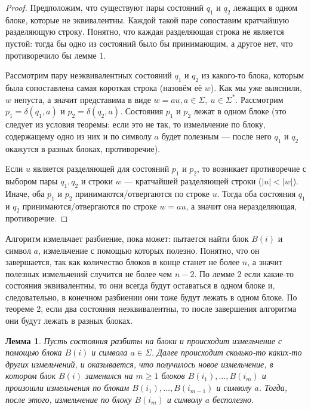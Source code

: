 \documentclass{article}
\newtheorem{lemma}{Лемма}
\begin{document}
\begin{proof}
Предположим, что существуют пары состояний $q_1$ и $q_2$ лежащих в одном блоке, которые не эквивалентны. Каждой такой паре сопоставим кратчайшую разделяющую строку. Понятно, что каждая разделяющая строка не является пустой: тогда бы одно из состояний было бы принимающим, а другое нет, что противоречило бы лемме 1.

Рассмотрим пару неэквивалентных состояний $q_1$ и $q_2$ из какого-то блока, которым была сопоставлена самая короткая строка (назовём её $w$). Как мы уже выяснили, $w$ непуста, а значит представима в виде $w = au, a \in \Sigma, \ u \in \Sigma^*$. Рассмотрим $p_1 = \delta(q_1, a)$ и $p_2 = \delta(q_2, a)$. Состояния $p_1$ и $p_2$ лежат в одном блоке (это следует из условия теоремы: если это не так, то измельчение по блоку, содержащему одно из них и по символу $a$ будет полезным --- после него $q_1$ и $q_2$ окажутся в разных блоках, противоречие).

Если $u$ является разделяющей для состояний $p_1$ и $p_2$, то возникает противоречие с выбором пары $q_1, q_2$ и строки $w$ --- кратчайшей разделяющей строки ($|u| < |w|$). Иначе, оба $p_1$ и $p_2$ принимаются/отвергаются по строке $u$. Тогда оба состояния $q_1$ и $q_2$ принимаются/отвергаются по строке $w=au$, а значит она неразделяющая, противоречие.
\end{proof}
Алгоритм измельчает разбиение, пока может: пытается найти блок $B(i)$ и символ $a$, измельчение с помощью которых полезно. Понятно, что он завершается, так как количество блоков в конце станет не более $n$, а значит полезных измельчений случится не более чем $n - 2$. По лемме 2 если какие-то состояния эквивалентны, то они всегда будут оставаться в одном блоке и, следовательно, в конечном разбиении они тоже будут лежать в одном блоке. По теореме 2, если два состояния неэквивалентны, то после завершения алгоритма они будут лежать в разных блоках. 
\begin{lemma}
    Пусть состояния разбиты на блоки и происходит измельчение с помощью блока $B(i)$ и символа $a \in \Sigma$. Далее происходит сколько-то каких-то других измельчений, и оказывается, что получилось новое измельчение, в котором блок $B(i)$ заменился на $m \ge 1$ блоков $B(i_1), \dots, B(i_m)$ и произошли измельчения по блокам $B(i_1), \dots , B(i_{m - 1})$ и символу $a$. Тогда, после этого, измельчение по блоку $B(i_m)$ и символу $a$ бесполезно.
\end{lemma}
\end{document}

